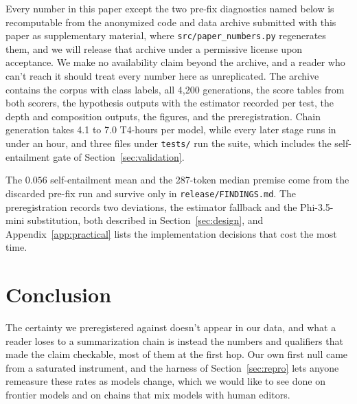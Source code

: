 \documentclass{article}
\begin{document}
Every number in this paper except the two pre-fix diagnostics named below is recomputable from the anonymized code and data archive submitted with this paper as supplementary material, where \texttt{src/paper\_numbers.py} regenerates them, and we will release that archive under a permissive license upon acceptance. We make no availability claim beyond the archive, and a reader who can't reach it should treat every number here as unreplicated. The archive contains the corpus with class labels, all 4{,}200 generations, the score tables from both scorers, the hypothesis outputs with the estimator recorded per test, the depth and composition outputs, the figures, and the preregistration. Chain generation takes 4.1 to 7.0 T4-hours per model, while every later stage runs in under an hour, and three files under \texttt{tests/} run the suite, which includes the self-entailment gate of Section~\ref{sec:validation}.

The $0.056$ self-entailment mean and the 287-token median premise come from the discarded pre-fix run and survive only in \texttt{release/FINDINGS.md}. The preregistration records two deviations, the estimator fallback and the Phi-3.5-mini substitution, both described in Section~\ref{sec:design}, and Appendix~\ref{app:practical} lists the implementation decisions that cost the most time.

\section{Conclusion}

The certainty we preregistered against doesn't appear in our data, and what a reader loses to a summarization chain is instead the numbers and qualifiers that made the claim checkable, most of them at the first hop. Our own first null came from a saturated instrument, and the harness of Section~\ref{sec:repro} lets anyone remeasure these rates as models change, which we would like to see done on frontier models and on chains that mix models with human editors.
\end{document}
